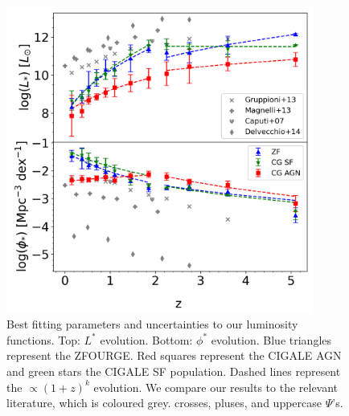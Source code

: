 \begin{figure}[ht!]
    \centering
    \includegraphics[width=0.9\textwidth]{Figures/Param_Evo.png}
    \caption{Best fitting parameters and uncertainties to our luminosity functions. Top: $L^{*}$ evolution. Bottom: $\phi^{*}$ evolution. Blue triangles represent the ZFOURGE. Red squares represent the CIGALE AGN and green stars the CIGALE SF population. Dashed lines represent the $\propto(1+z)^k$ evolution. We compare our results to the relevant literature, which is coloured grey. \cite{gruppioni_herschel_2013} crosses, \cite{magnelli_deepest_2013} pluses, and \cite{caputi_infrared_2007} uppercase $\Psi$'s.}
    \label{Fig: Param Evo}
\end{figure}

